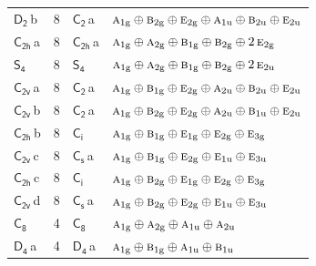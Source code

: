 \documentclass[10pt,a4paper]{article}
\numberwithin{equation}{section}
\newcommand{\grp}[1]{\mathsf{#1}}
\newcommand{\irr}[1]{\text{\normalfont\scshape #1}}
\newcommand{\ptag}[1]{\mathrm{#1}}
\newcommand{\clsletter}[1]{\,{\scriptsize\color{black!55}#1}}
\newlength{\fillwidth}\newlength{\cellwidth}\newlength{\colwidth}
\begin{document}
{\begin{longtable}{@{}lrl>{\RaggedRight\arraybackslash}p{\fillwidth}@{}}
\href{D2.pdf}{$\grp{D_{2}}$}\clsletter{b} & 8 & \href{C2.pdf}{$\grp{C_{2}}$}\clsletter{a} & $\irr{a}_{1\ptag{g}}\oplus \irr{b}_{2\ptag{g}}\oplus \irr{e}_{2\ptag{g}}\oplus \irr{a}_{1\ptag{u}}\oplus \irr{b}_{2\ptag{u}}\oplus \irr{e}_{2\ptag{u}}$\\
\href{C2h.pdf}{$\grp{C_{2h}}$}\clsletter{a} & 8 & \href{C2h.pdf}{$\grp{C_{2h}}$}\clsletter{a} & $\irr{a}_{1\ptag{g}}\oplus \irr{a}_{2\ptag{g}}\oplus \irr{b}_{1\ptag{g}}\oplus \irr{b}_{2\ptag{g}}\oplus 2\,\irr{e}_{2\ptag{g}}$\\
\href{S4.pdf}{$\grp{S_{4}}$} & 8 & \href{S4.pdf}{$\grp{S_{4}}$} & $\irr{a}_{1\ptag{g}}\oplus \irr{a}_{2\ptag{g}}\oplus \irr{b}_{1\ptag{g}}\oplus \irr{b}_{2\ptag{g}}\oplus 2\,\irr{e}_{2\ptag{u}}$\\
\href{C2v.pdf}{$\grp{C_{2v}}$}\clsletter{a} & 8 & \href{C2.pdf}{$\grp{C_{2}}$}\clsletter{a} & $\irr{a}_{1\ptag{g}}\oplus \irr{b}_{1\ptag{g}}\oplus \irr{e}_{2\ptag{g}}\oplus \irr{a}_{2\ptag{u}}\oplus \irr{b}_{2\ptag{u}}\oplus \irr{e}_{2\ptag{u}}$\\
\href{C2v.pdf}{$\grp{C_{2v}}$}\clsletter{b} & 8 & \href{C2.pdf}{$\grp{C_{2}}$}\clsletter{a} & $\irr{a}_{1\ptag{g}}\oplus \irr{b}_{2\ptag{g}}\oplus \irr{e}_{2\ptag{g}}\oplus \irr{a}_{2\ptag{u}}\oplus \irr{b}_{1\ptag{u}}\oplus \irr{e}_{2\ptag{u}}$\\
\href{C2h.pdf}{$\grp{C_{2h}}$}\clsletter{b} & 8 & \href{S2.pdf}{$\grp{C_{i}}$} & $\irr{a}_{1\ptag{g}}\oplus \irr{b}_{1\ptag{g}}\oplus \irr{e}_{1\ptag{g}}\oplus \irr{e}_{2\ptag{g}}\oplus \irr{e}_{3\ptag{g}}$\\
\href{C2v.pdf}{$\grp{C_{2v}}$}\clsletter{c} & 8 & \href{C1v.pdf}{$\grp{C_{s}}$}\clsletter{a} & $\irr{a}_{1\ptag{g}}\oplus \irr{b}_{1\ptag{g}}\oplus \irr{e}_{2\ptag{g}}\oplus \irr{e}_{1\ptag{u}}\oplus \irr{e}_{3\ptag{u}}$\\
\href{C2h.pdf}{$\grp{C_{2h}}$}\clsletter{c} & 8 & \href{S2.pdf}{$\grp{C_{i}}$} & $\irr{a}_{1\ptag{g}}\oplus \irr{b}_{2\ptag{g}}\oplus \irr{e}_{1\ptag{g}}\oplus \irr{e}_{2\ptag{g}}\oplus \irr{e}_{3\ptag{g}}$\\
\href{C2v.pdf}{$\grp{C_{2v}}$}\clsletter{d} & 8 & \href{C1v.pdf}{$\grp{C_{s}}$}\clsletter{a} & $\irr{a}_{1\ptag{g}}\oplus \irr{b}_{2\ptag{g}}\oplus \irr{e}_{2\ptag{g}}\oplus \irr{e}_{1\ptag{u}}\oplus \irr{e}_{3\ptag{u}}$\\
\href{C8.pdf}{$\grp{C_{8}}$} & 4 & \href{C8.pdf}{$\grp{C_{8}}$} & $\irr{a}_{1\ptag{g}}\oplus \irr{a}_{2\ptag{g}}\oplus \irr{a}_{1\ptag{u}}\oplus \irr{a}_{2\ptag{u}}$\\
\href{D4.pdf}{$\grp{D_{4}}$}\clsletter{a} & 4 & \href{D4.pdf}{$\grp{D_{4}}$}\clsletter{a} & $\irr{a}_{1\ptag{g}}\oplus \irr{b}_{1\ptag{g}}\oplus \irr{a}_{1\ptag{u}}\oplus \irr{b}_{1\ptag{u}}$\\

\end{longtable}}
\end{document}
